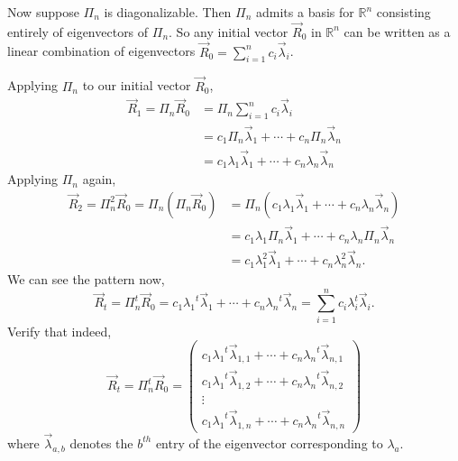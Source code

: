\documentclass[11pt]{article}
\theoremstyle{plain}
\theoremstyle{definition}
\begin{document}
Now suppose $\Pi_n$ is diagonalizable. Then $\Pi_n$ admits a basis for $\mathbb{R}^n$ consisting entirely of eigenvectors of $\Pi_n$. So any initial vector $\vec{R}_0$ in $\mathbb{R}^n$ can be written as a linear combination of eigenvectors $\vec{R}_0=\displaystyle\sum\limits_{i=1}^n c_i\vec{\lambda}_i$.

Applying $\Pi_n$ to our initial vector $\vec{R}_0$,
\begin{equation*}\begin{split}
\vec{R}_1 = \Pi_n \vec{R}_0 &= \Pi_n\displaystyle\sum\limits_{i=1}^n c_i\vec{\lambda}_i \\
&= c_1\Pi_n\vec{\lambda}_1+\cdots+c_n\Pi_n\vec{\lambda}_n \\
&= c_1\lambda_1\vec{\lambda}_1+\cdots+c_n \lambda_n \vec{\lambda}_n\end{split}
\end{equation*}
Applying $\Pi_n$ again,
\begin{equation*}\begin{split}
\vec{R}_2=\Pi_n^2\vec{R}_0 = \Pi_n(\Pi_n\vec{R}_0) &=\Pi_n(c_1\lambda_1\vec{\lambda}_1+\cdots+c_n\lambda_n\vec{\lambda}_n) \\
&=c_1\lambda_1\Pi_n\vec{\lambda}_1+\cdots+c_n\lambda_n\Pi_n\vec{\lambda}_n \\
&=c_1\lambda_1^2{\vec{\lambda}_1}+\cdots+c_n\lambda_n^2{\vec{\lambda}_n}.\end{split}\end{equation*}
We can see the pattern now,
\begin{equation}\label{eq:9}
\vec{R}_t=\Pi_n^t\vec{R}_0 = c_1{\lambda_1}^t\vec{\lambda}_1+\cdots+c_n{\lambda_n}^t\vec{\lambda}_n=\displaystyle\sum\limits_{i=1}^n c_i\lambda_i^t\vec{\lambda}_i.
\end{equation}
Verify that indeed,
\begin{equation*}
\vec{R}_t=\Pi_n^t\vec{R}_0 =\left( \begin{array}{c}
c_1{\lambda_1}^t\vec{\lambda}_{1, 1}+\cdots+c_n{\lambda_n}^t\vec{\lambda}_{n, 1} \\
c_1{\lambda_1}^t\vec{\lambda}_{1, 2}+\cdots+c_n{\lambda_n}^t\vec{\lambda}_{n, 2} \\
\vdots \\
c_1{\lambda_1}^t\vec{\lambda}_{1, n}+\cdots+c_n{\lambda_n}^t\vec{\lambda}_{n, n}\end{array}\right)
\end{equation*}
where $\vec{\lambda}_{a,b}$ denotes the $b^{th}$ entry of the eigenvector corresponding to $\lambda_a$.
\end{document}
